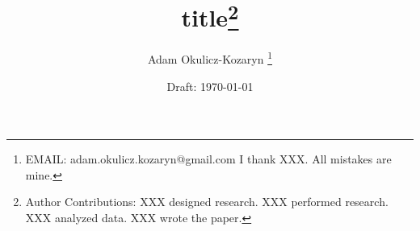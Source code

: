 \documentclass[10pt, letterpaper]{article}
\date{Draft: {}\today}
\title{title\footnote{Author Contributions:
  XXX designed
  research. XXX performed research. XXX analyzed data. XXX wrote the paper.
}
}
\author{Adam Okulicz-Kozaryn
\thanks{EMAIL: adam.okulicz.kozaryn@gmail.com
\hfill  I thank XXX.  All mistakes are mine.} 
}
\begin{document}

%

\maketitle
\vspace{-.4in}
\begin{center}
\end{center}


\vspace{.15in} 

\begin{abstract}
\noindent  
\end{abstract}
\end{document}
